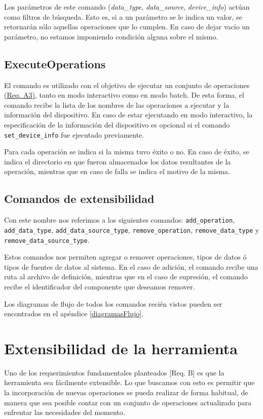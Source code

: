 Los parámetros de este comando (\emph{data\_type}, \emph{data\_source}, \emph{device\_info}) actúan como filtros de búsqueda. Esto es, si a un parámetro se le indica un valor, se retornarán sólo aquellas operaciones que lo cumplen. En caso de dejar vacío un parámetro, no estamos imponiendo condición alguna sobre el mismo.

\subsection*{ExecuteOperations}
El comando es utilizado con el objetivo de ejecutar un conjunto de operaciones \hyperref[reqA3]{(Req. A3)}, tanto en modo interactivo como en modo batch. De esta forma, el comando recibe la lista de los nombres de las operaciones a ejecutar y la información del dispositivo. En caso de estar ejecutando en modo interactivo, la especificación de la información del dispositivo es opcional si el comando \texttt{set\_device\_info} fue ejecutado previamente.

Para cada operación se indica si la misma tuvo éxito o no. En caso de éxito, se indica el directorio en que fueron almacenados los datos resultantes de la operación, mientras que en caso de falla se indica el motivo de la misma.

\subsection*{Comandos de extensibilidad}
Con este nombre nos referimos a los siguientes comandos: \texttt{add\_operation}, \texttt{add\_data\_type}, \texttt{add\_data\_source\_type}, \texttt{remove\_operation}, \texttt{remove\_data\-\_type} y \texttt{remove\_data\_source\_type}.

Estos comandos nos permiten agregar o remover operaciones, tipos de datos ó tipos de fuentes de datos al sistema. En el caso de adición, el comando recibe una ruta al archivo de definición, mientras que en el caso de supresión, el comando recibe el identificador del componente que deseamos remover.
\newline

Los diagramas de flujo de todos los comandos recién vistos pueden ser encontrados en el apéndice \ref{diagramasFlujo}.

\section{Extensibilidad de la herramienta}
\label{extensibilidadDeLaHerramienta}
Uno de los requerimientos fundamentales planteados [Req. B] es que la herramienta sea fácilmente extensible. Lo que buscamos con esto es permitir que la incorporación de nuevas operaciones se pueda realizar de forma habitual, de manera que sea posible contar con un conjunto de operaciones actualizado para enfrentar las necesidades del momento.

